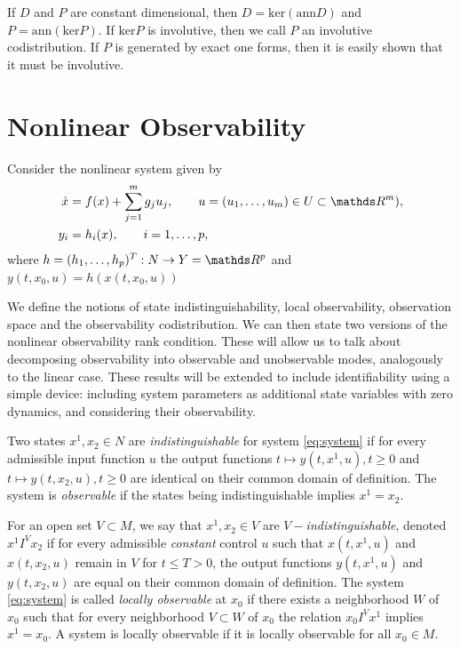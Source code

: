If $D$ and $P$ are constant dimensional, then $D = \text{ker}( \text{ann} D)$ and $P = \text{ann}(\text{ker} P)$. If $\text{ker} P$ is involutive, then we call $P$ an involutive codistribution. If $P$ is generated by exact one forms, then it is easily shown that it must be involutive. 


\section{Nonlinear Observability}
Consider the nonlinear system given by 
\begin{equation}
    \begin{aligned}
        \dot x & = {} f(x) + \sum_{j = 1}^m g_j u_j, \qquad u = (u_1, \dots, u_m) \in U\subset \R^m), \\
        y_i & = {} h_i(x), \qquad i = 1, \dots, p,
    \end{aligned}\label{eq:system}
\end{equation}
where $h = (h_1, \dots, h_p)^T:N\rightarrow Y=\R^p$ and $y(t, x_0, u) = h(x(t, x_0, u))$

We define the notions of state indistinguishability, local observability, observation space and the observability codistribution. We can then state two versions of the nonlinear observability rank condition. These will allow us to talk about decomposing observability into observable and unobservable modes, analogously to the linear case. These results will be extended to include identifiability using a simple device: including system parameters as additional state variables with zero dynamics, and considering their observability. 

\begin{defn}
    Two states $x^1, x_2\in N$ are \textit{indistinguishable} for system \eqref{eq:system} if for every admissible input function $u$ the output functions $t\mapsto y(t, x^1, u), t\geq 0$ and $t\mapsto y(t, x_2, u), t\geq 0$ are identical on their common domain of definition. The system is \textit{observable} if the states being indistinguishable implies $x^1=x_2$. 
\end{defn}

\begin{defn}
    For an open set $V\subset M$, we say that $x^1, x_2 \in V$ are \textit{$V-$indistinguishable}, denoted $x^1 I^V x_2$ if for every admissible \textit{constant} control $u$ such that $x(t, x^1, u)$ and $x(t, x_2, u)$ remain in $V$ for $t\leq T > 0$, the output functions $y(t, x^1, u)$ and $y(t, x_2, u)$ are equal on their common domain of definition. The system \eqref{eq:system} is called \textit{locally observable} at $x_0$ if there exists a neighborhood $W$ of $x_0$ such that for every neighborhood $V\subset W$ of $x_0$ the relation $x_0 I^V x^1$ implies $x^1 = x_0$. A system is locally observable if it is locally observable for all $x_0 \in M$. 
\end{defn}


